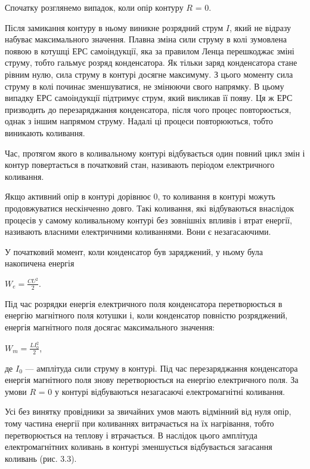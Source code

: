 \documentclass[12pt,a4paper]{article}
\begin{document}
    Спочатку розглянемо випадок, коли опір контуру $R$ = 0.

    Після замикання контуру в ньому виникне розрядний струм $I$, який не відразу набуває максимального значення.
    Плавна зміна сили струму в колі зумовлена появою в котушці ЕРС самоіндукції, яка за правилом Ленца перешкоджає зміні струму,
    тобто гальмує розряд конденсатора. Як тільки заряд конденсатора стане рівним нулю, сила струму в контурі досягне максимуму.
    З цього моменту сила струму в колі починає зменшуватися, не змінюючи свого напрямку.
    В цьому випадку ЕРС самоіндукції підтримує струм, який викликав її появу.
    Ця ж ЕРС призводить до перезаряджання конденсатора, після чого процес повторюється, однак з іншим напрямом струму.
    Надалі ці процеси повторюються, тобто виникають коливання.

    Час, протягом якого в коливальному контурі відбувається один повний цикл змін і контур повертається в початковий стан, називають періодом електричного коливання.

    Якщо активний опір в контурі дорівнює 0, то коливання в контурі можуть продовжуватися нескінченно довго.
    Такі коливання, які відбуваються внаслідок процесів у самому коливальному контурі без зовнішніх впливів і втрат енергії,
    називають власними електричними коливаннями. Вони є незагасаючими.

    У початковий момент, коли конденсатор був заряджений, у ньому була накопичена енергія

    \begin{center}
        $\displaystyle W_e = \frac{CU^2}{2}.$
    \end{center}

    Під час розрядки енергія електричного поля конденсатора перетворюється в енергію магнітного поля котушки і,
    коли конденсатор повністю розряджений, енергія магнітного поля досягає максимального значення:

    \begin{center}
        $\displaystyle W_m = \frac{LI_0^2}{2}$,
    \end{center}

    де $I_0$ --- амплітуда сили струму в контурі. Під час перезаряджання конденсатора енергія магнітного поля знову перетворюється на енергію електричного поля.
    За умови $R$ = 0 у контурі відбуваються незагасаючі електромагнітні коливання.

    Усі без винятку провідники за звичайних умов мають відмінний від нуля опір, тому частина енергії при
    коливаннях витрачається на їх нагрівання, тобто перетворюється на теплову і втрачається.
    В наслідок цього амплітуда електромагнітних коливань в контурі зменшується
    відбувається загасання коливань (рис. 3.3).
\end{document}
